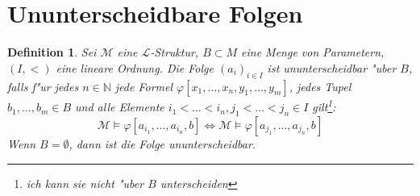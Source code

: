 \documentclass[a4paper,12pt,numbers=noenddot,parskip=full]{scrartcl}
\newcommand{\setN}{\mathbb{N}}
\newcommand{\scrL}{\mathcal{L}}
\newcommand{\scrM}{\mathcal{M}}
\theoremstyle{dotless}
\newtheorem{definition}[theorem]{Definition}
\begin{document}
\newpage
\section{Ununterscheidbare Folgen}
\begin{definition}
	Sei $\scrM$ eine $\scrL$-Struktur, $B \subset M$ eine Menge von Parametern, $(I,<)$ eine lineare Ordnung. Die Folge $(a_i)_{i \in I}$ ist \emph{ununterscheidbar} "uber $B$, falls f"ur jedes $n \in \setN$ jede Formel $\varphi[x_1, \dots, x_n, y_1, \dots, y_m]$, jedes Tupel $b_1, \dots, b_m \in B$ und alle Elemente $i_1< \dots < i_n, j_1<\dots <j_n \in I$ gilt\footnote{ich kann sie nicht "uber $B$ unterscheiden}:
	\begin{equation*}
		\scrM \models \varphi[a_{i_1}, \dots, a_{i_n}, b] \Leftrightarrow \scrM \models \varphi[a_{j_1}, \dots, a_{j_n}, b]
	\end{equation*}
	Wenn $B=\emptyset$, dann ist die Folge ununterscheidbar.
\end{definition}
\end{document}
